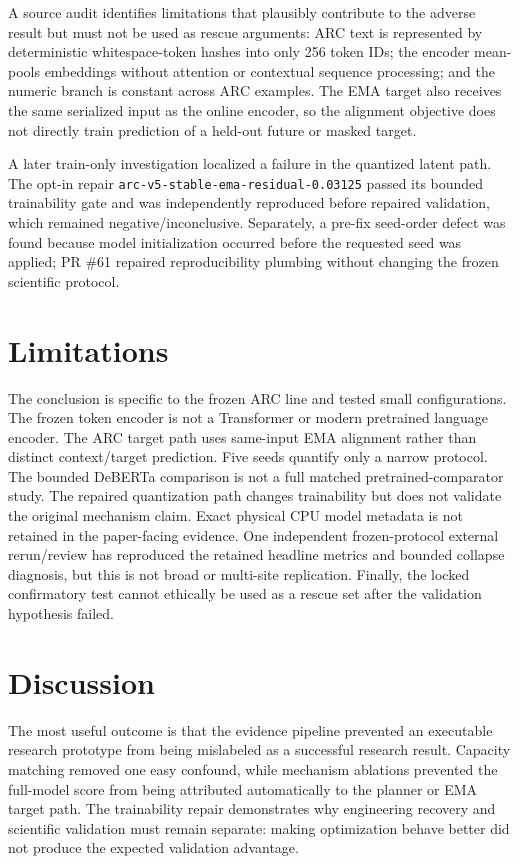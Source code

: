 \documentclass{article}
\begin{document}
A source audit identifies limitations that plausibly contribute to the adverse result but must not be used as rescue arguments: ARC text is represented by deterministic whitespace-token hashes into only 256 token IDs; the encoder mean-pools embeddings without attention or contextual sequence processing; and the numeric branch is constant across ARC examples. The EMA target also receives the same serialized input as the online encoder, so the alignment objective does not directly train prediction of a held-out future or masked target.

A later train-only investigation localized a failure in the quantized latent path. The opt-in repair \texttt{arc-v5-stable-ema-residual-0.03125} passed its bounded trainability gate and was independently reproduced before repaired validation, which remained negative/inconclusive. Separately, a pre-fix seed-order defect was found because model initialization occurred before the requested seed was applied; PR \#61 repaired reproducibility plumbing without changing the frozen scientific protocol.

\section{Limitations}
The conclusion is specific to the frozen ARC line and tested small configurations. The frozen token encoder is not a Transformer or modern pretrained language encoder. The ARC target path uses same-input EMA alignment rather than distinct context/target prediction. Five seeds quantify only a narrow protocol. The bounded DeBERTa comparison is not a full matched pretrained-comparator study. The repaired quantization path changes trainability but does not validate the original mechanism claim. Exact physical CPU model metadata is not retained in the paper-facing evidence. One independent frozen-protocol external rerun/review has reproduced the retained headline metrics and bounded collapse diagnosis, but this is not broad or multi-site replication. Finally, the locked confirmatory test cannot ethically be used as a rescue set after the validation hypothesis failed.

\section{Discussion}
The most useful outcome is that the evidence pipeline prevented an executable research prototype from being mislabeled as a successful research result. Capacity matching removed one easy confound, while mechanism ablations prevented the full-model score from being attributed automatically to the planner or EMA target path. The trainability repair demonstrates why engineering recovery and scientific validation must remain separate: making optimization behave better did not produce the expected validation advantage.
\end{document}
